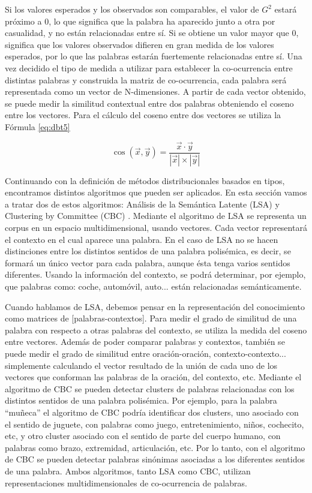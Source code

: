 Si los valores esperados y los observados son comparables, el valor de $G^2$ estará próximo a 0, lo que significa que la palabra ha aparecido junto a otra por casualidad, y no están relacionadas entre sí. Si se obtiene un valor mayor que 0, significa que los valores observados difieren en gran medida de los valores esperados, por lo que las palabras estarán fuertemente relacionadas entre sí.
Una vez decidido el tipo de medida a utilizar para establecer la co-ocurrencia entre distintas palabras y construida la matriz de co-ocurrencia, cada palabra será representada como un vector de N-dimensiones. A partir de cada vector obtenido, se puede medir la similitud contextual entre dos palabras obteniendo el coseno entre los vectores. Para el cálculo del coseno entre dos vectores se utiliza la Fórmula \ref{eq:dbt5}

\begin{equation}
  \cos (\vec{x},\vec{y})=\frac{\vec{x}\cdot\vec{y}}{|\vec{x}|\times |\vec{y}|}
  \label{eq:dbt5}
\end{equation}

Continuando con la definición de métodos distribucionales basados en tipos, encontramos distintos algoritmos que pueden ser aplicados. En esta sección vamos a tratar dos de estos algoritmos: Análisis de la Semántica Latente (LSA) \cite{013} y Clustering by Committee (CBC) \cite{014}. Mediante el algoritmo de LSA se representa un corpus en un espacio multidimensional, usando vectores. Cada vector representará el contexto en el cual aparece una palabra. En el caso de LSA no se hacen distinciones entre los distintos sentidos de una palabra polisémica, es decir, se formará un único vector para cada palabra, aunque ésta tenga varios sentidos diferentes. Usando la información del contexto, se podrá determinar, por ejemplo, que palabras como: coche, automóvil, auto... están relacionadas semánticamente.

Cuando hablamos de LSA, debemos pensar en la representación del conocimiento como matrices de [palabras-contextos]. Para medir el grado de similitud de una palabra con respecto a otras palabras del contexto, se utiliza la medida del coseno entre vectores. Además de poder comparar palabras y contextos, también se puede medir el grado de similitud entre oración-oración, contexto-contexto... simplemente calculando el vector resultado de la unión de cada uno de los vectores que conforman las palabras de la oración, del contexto, etc. Mediante el algoritmo de CBC se pueden detectar clusters de palabras relacionadas con los distintos sentidos de una palabra polisémica. Por ejemplo, para la palabra “muñeca” el algoritmo de CBC podría identificar dos clusters, uno asociado con el sentido de juguete, con palabras como juego, entretenimiento, niños, cochecito, etc, y otro cluster asociado con el sentido de parte del cuerpo humano, con palabras como brazo, extremidad, articulación, etc. Por lo tanto, con el algoritmo de CBC se pueden detectar palabras sinónimas asociadas a los diferentes sentidos de una palabra. Ambos algoritmos, tanto LSA como CBC, utilizan representaciones multidimensionales de co-ocurrencia de palabras.

